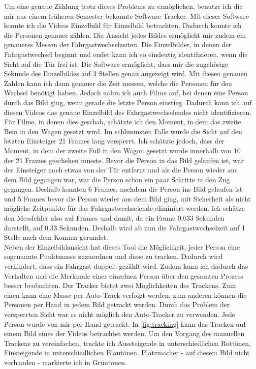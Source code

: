 Um eine genaue Zählung trotz dieses Problems zu ermöglichen, benutze ich die mir aus einem früheren Semester bekannte Software \textsf{Tracker}. Mit dieser Software konnte ich die Videos Einzelbild für Einzelbild betrachten. Dadurch konnte ich die Personen genauer zählen. Die Ansicht jedes Bildes ermöglicht mir zudem ein genaueres Messen der Fahrgastwechselzeiten. Die Einzelbilder, in denen der Fahrgastwechsel beginnt und endet kann ich so eindeutig identifizieren, wenn die Sicht auf die Tür frei ist. Die Software ermöglicht, dass mir die zugehörige Sekunde des Einzelbildes auf 3 Stellen genau angezeigt wird. Mit diesen genauen Zahlen kann ich dann genauer die Zeit messen, welche die Personen für den Wechsel benötigt haben. Jedoch nahm ich auch Filme auf, bei denen eine Person durch das Bild ging, wenn gerade die letzte Person einstieg. Dadurch kann ich auf diesen Videos das genaue Einzelbild des Fahrgastwechselendes nicht identifizieren. Für Filme, in denen dies geschah, schätzte ich den Moment, in dem das zweite Bein in den Wagen gesetzt wird. Im schlimmsten Falle wurde die Sicht auf den letzten Einsteiger 21 Frames lang versperrt. Ich schätzte jedoch, dass der Moment, in dem der zweite Fuß in den Wagon gesetzt wurde innerhalb von 10 der 21 Frames geschehen musste. Bevor die Person in das Bild gelaufen ist, war der Einsteiger noch etwas von der Tür entfernt und als die Person wieder aus dem Bild gegangen war, war die Person schon ein paar Schritte in den Zug gegangen. Deshalb konnten 6 Frames, nachdem die Person ins Bild gelaufen ist und 5 Frames bevor die Person wieder aus dem Bild ging, mit Sicherheit als nicht mögliche Zeitpunkte für das Fahrgastwechselende eliminiert werden. Ich schätze den Messfehler also auf  Frames und damit, da ein Frame 0.033 Sekunden darstellt, auf 0.33 Sekunden. Deshalb wird ab nun die Fahrgastwechselzeit auf 1 Stelle nach dem Komma gerundet.\\
Neben der Einzelbildansicht hat dieses Tool die Möglichkeit, jeder Person eine sogenannte Punktmasse zuzuordnen und diese zu tracken. Dadurch wird verhindert, dass ein Fahrgast doppelt gezählt wird. Zudem kann ich dadurch das Verhalten und die Merkmale einer einzelnen Person über den gesamten Prozess besser beobachten. Der \textsf{Tracker} bietet zwei Möglichkeiten des Trackens. Zum einen kann eine Masse per Auto-Track verfolgt werden, zum anderen können die Personen per Hand in jedem Bild getrackt werden. Durch das Problem der versperrten Sicht war es nicht möglich den Auto-Tracker zu verwenden. Jede Person wurde von mir per Hand getrackt. In \figurename \ref{fig:tracking} kann das Tracken auf einem Bild eines der Videos betrachtet werden. Um den Vorgang des manuellen Trackens zu vereinfachen, trackte ich Aussteigende in unterschiedlichen Rottönen, Einsteigende in unterschiedlichen Blautönen. Platzmacher - auf diesem Bild nicht vorhanden - markierte ich in Grüntönen. \\
